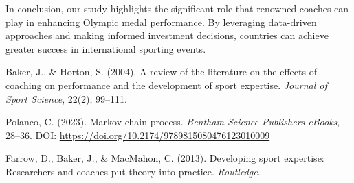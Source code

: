 \documentclass[12pt]{article}
\begin{document}
In conclusion, our study highlights the significant role that renowned coaches can play in enhancing Olympic medal performance. By leveraging data-driven approaches and making informed investment decisions, countries can achieve greater success in international sporting events.


\begin{thebibliography}{99}

    Baker, J., \& Horton, S. (2004). A review of the literature on the effects of coaching on performance and the development of sport expertise. \textit{Journal of Sport Science}, 22(2), 99--111.
    
    Polanco, C. (2023). Markov chain process. \textit{Bentham Science Publishers eBooks}, 28--36. DOI: \url{https://doi.org/10.2174/9789815080476123010009}
    
    Farrow, D., Baker, J., \& MacMahon, C. (2013). Developing sport expertise: Researchers and coaches put theory into practice. \textit{Routledge}.
    
    \end{thebibliography}
\end{document}
